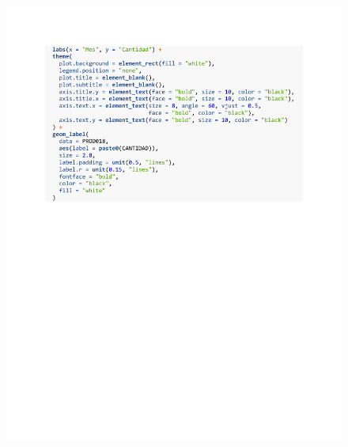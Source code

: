 \begin{figure}[h!]
        \begin{tcolorbox}[colback=white, colframe=black, boxrule=1.5pt, sharp corners=all]
            {\includegraphics[width=\linewidth, height=22cm, trim=2.5cm 2.75cm 2.5cm 2.5cm, clip]{images/script16.pdf}}
        \end{tcolorbox}
\end{figure}

